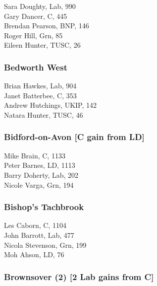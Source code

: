 \documentclass[a4paper,openany,10pt]{book}
\begin{document}


Sara Doughty, Lab, 990\\
Gary Dancer, C, 445\\
Brendan Pearson, BNP, 146\\
Roger Hill, Grn, 85\\
Eileen Hunter, TUSC, 26\\


\subsubsection*{Bedworth West}



Brian Hawkes, Lab, 904\\
Janet Batterbee, C, 353\\
Andrew Hutchings, UKIP, 142\\
Natara Hunter, TUSC, 46\\


\subsubsection*{Bidford-on-Avon \hspace*{\fill}\nolinebreak[1]%
\enspace\hspace*{\fill}
[C gain from LD]}



Mike Brain, C, 1133\\
Peter Barnes, LD, 1113\\
Barry Doherty, Lab, 202\\
Nicole Varga, Grn, 194\\


\subsubsection*{Bishop's Tachbrook}



Les Caborn, C, 1104\\
John Barrott, Lab, 477\\
Nicola Stevenson, Grn, 199\\
Moh Ahson, LD, 76\\


\subsubsection*{Brownsover (2) \hspace*{\fill}\nolinebreak[1]%
\enspace\hspace*{\fill}
[2 Lab gains from C]}
\end{document}
